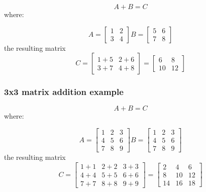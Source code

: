 \documentclass{article}
\begin{document}
\begin{equation*}
  A + B = C 
\end{equation*}
where: 

\[
A = \begin{bmatrix}
    1  & 2      \\
    3  & 4     
\end{bmatrix}
B = \begin{bmatrix}
    5  &  6      \\
    7  &  8      
\end{bmatrix} 
\]
the resulting matrix  
\[C =  
\begin{bmatrix}
    1+5  &  2+6      \\
    3+7  &  4+8      
\end{bmatrix}
=
\begin{bmatrix}
    6  &  8      \\
    10  & 12      
\end{bmatrix}
\]
\vspace{2pc}

\subsubsection{3x3 matrix addition example}

\begin{equation*}
  A + B = C 
\end{equation*}
where: 

\[
A = \begin{bmatrix}
    1 & 2 & 3   \\
    4 & 5 & 6   \\
    7 & 8 & 9     
\end{bmatrix}
B = \begin{bmatrix}
    1 & 2 & 3   \\
    4 & 5 & 6   \\
    7 & 8 & 9     
\end{bmatrix} 
\]
the resulting matrix
\[C =
\begin{bmatrix}
    1+1 & 2+2 & 3+3  \\
    4+4 & 5+5 & 6+6  \\ 
    7+7 & 8+8 & 9+9     
\end{bmatrix}
=
\begin{bmatrix}
    2 & 4 & 6   \\
    8 & 10 & 12 \\
    14 & 16 & 18      
\end{bmatrix}
\]
\end{document}
